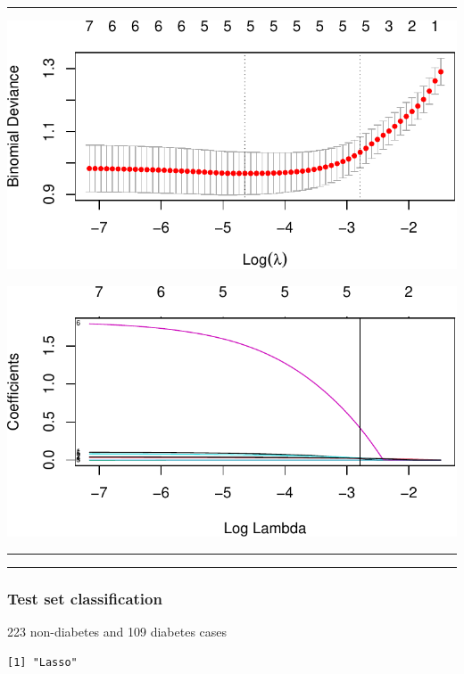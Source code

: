 \documentclass[
  letterpaper,
  DIV=11,
  numbers=noendperiod]{scrartcl}
\begin{document}
\begin{center}\rule{0.5\linewidth}{0.5pt}\end{center}

\includegraphics{L17v2_files/figure-pdf/unnamed-chunk-4-1.pdf}

\includegraphics{L17v2_files/figure-pdf/unnamed-chunk-4-2.pdf}

\begin{center}\rule{0.5\linewidth}{0.5pt}\end{center}

\begin{center}\rule{0.5\linewidth}{0.5pt}\end{center}

\hypertarget{test-set-classification}{%
\subsubsection{Test set classification}\label{test-set-classification}}

223 non-diabetes and 109 diabetes cases

\begin{verbatim}
[1] "Lasso"
\end{verbatim}
\end{document}
